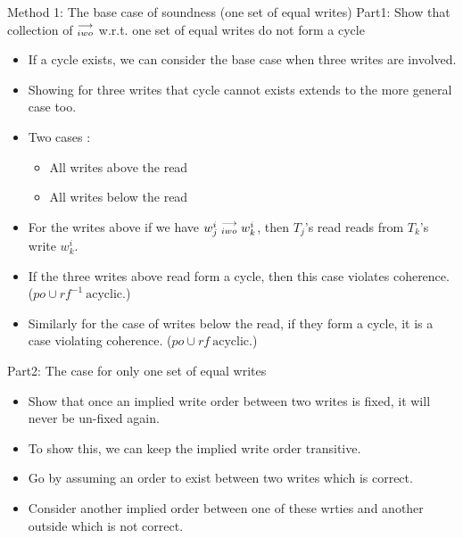         Method 1: The base case of soundness (one set of equal writes)
        Part1: Show that collection of $\stackrel{\longrightarrow}{_{iwo}}$ w.r.t. one set of equal writes do not form a cycle
        \begin{itemize}
            \item If a cycle exists, we can consider the base case when three writes are involved.
            \item Showing for three writes that cycle cannot exists extends to the more general case too. 
            \item Two cases : \begin{itemize}
                                    \item All writes above the read
                                    \item All writes below the read
                            \end{itemize}
            \item For the writes above if we have $w_j^i\stackrel{\longrightarrow}{_{iwo}}w_k^i$, then $T_j$'s read reads from $T_k$'s write $w_k^i$. 
            \item If the three writes above read form a cycle, then this case violates coherence. ($po \cup rf^{-1} \ \text{acyclic}$.)
            \item Similarly for the case of writes below the read, if they form a cycle, it is a case violating coherence. ($po \cup rf \ \text{acyclic}$.)
        \end{itemize}

    

        Part2: The case for only one set of equal writes 
        \begin{itemize}
            \item Show that once an implied write order between two writes is fixed, it will never be un-fixed again.
            \item To show this, we can keep the implied write order transitive. 
            \item Go by assuming an order to exist between two writes which is correct. 
            \item Consider another implied order between one of these wrties and another outside which is not correct. 
        \end{itemize}